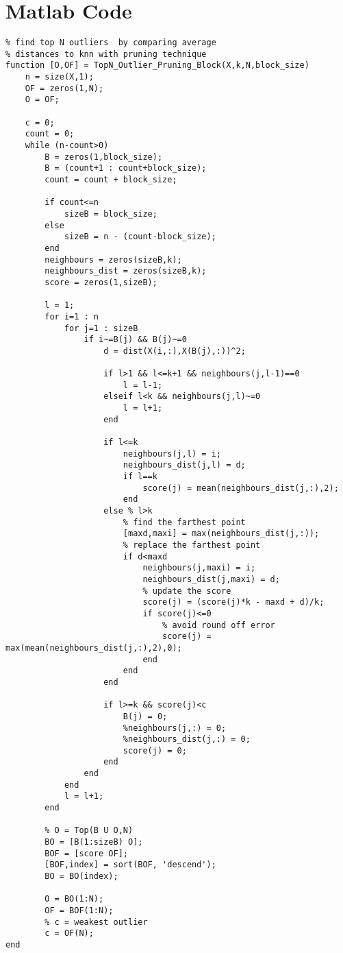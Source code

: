 \appendix

\chapter{Matlab Code}
\label{apdx:matlabCode}
\lstset{language=Matlab}
\begin{lstlisting}
% find top N outliers  by comparing average 
% distances to knn with pruning technique
function [O,OF] = TopN_Outlier_Pruning_Block(X,k,N,block_size)
	n = size(X,1);
	OF = zeros(1,N);
	O = OF;

	c = 0;
	count = 0;
	while (n-count>0)
		B = zeros(1,block_size);
		B = (count+1 : count+block_size);
		count = count + block_size;        
		
		if count<=n
			sizeB = block_size;
		else
			sizeB = n - (count-block_size);
		end
		neighbours = zeros(sizeB,k);
		neighbours_dist = zeros(sizeB,k);
		score = zeros(1,sizeB);

		l = 1;
		for i=1 : n
			for j=1 : sizeB
				if i~=B(j) && B(j)~=0
					d = dist(X(i,:),X(B(j),:))^2;
		            
					if l>1 && l<=k+1 && neighbours(j,l-1)==0
						l = l-1;
					elseif l<k && neighbours(j,l)~=0
						l = l+1;
					end
		            
					if l<=k 
						neighbours(j,l) = i;   
						neighbours_dist(j,l) = d;
						if l==k
							score(j) = mean(neighbours_dist(j,:),2);
						end
					else % l>k
						% find the farthest point
						[maxd,maxi] = max(neighbours_dist(j,:));
						% replace the farthest point
						if d<maxd 
							neighbours(j,maxi) = i;
							neighbours_dist(j,maxi) = d;
							% update the score
							score(j) = (score(j)*k - maxd + d)/k;
							if score(j)<=0
								% avoid round off error
								score(j) = max(mean(neighbours_dist(j,:),2),0);
							end
						end                    
					end
		            
					if l>=k && score(j)<c
						B(j) = 0;                    
						%neighbours(j,:) = 0;
						%neighbours_dist(j,:) = 0;
						score(j) = 0;                   
					end                                            
				end
			end
			l = l+1;
		end
		
		% O = Top(B U O,N)
		BO = [B(1:sizeB) O];
		BOF = [score OF];
		[BOF,index] = sort(BOF, 'descend');
		BO = BO(index);
		
		O = BO(1:N);
		OF = BOF(1:N);    
		% c = weakest outlier
		c = OF(N);
end
\end{lstlisting}

